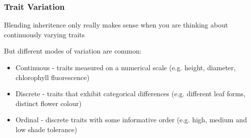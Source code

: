 \documentclass{beamer}
\begin{document}
\begin{frame}

	\frametitle{Trait Variation}

	Blending inheritence only really makes sense when you are thinking about continuously varying traits
	
	\vspace{5pt}

But different modes of variation are common:\pause
\begin{itemize}
	\item Continuous  - traits measured on a numerical scale (e.g. height, diameter, chlorophyll fluorescence) \pause
	\item Discrete - traits that exhibit categorical differences (e.g. different leaf forms, distinct flower colour) \pause
	\item Ordinal - discrete traits with some informative order (e.g. high, medium and low shade tolerance)
	
\end{itemize}

\end{frame}
\end{document}
